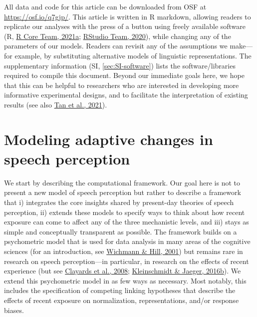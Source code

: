 \documentclass[
  11pt,
  man,floatsintext]{apa6}
\begin{document}
All data and code for this article can be downloaded from OSF at \url{https://osf.io/q7gjp/}. This article is written in R markdown, allowing readers to replicate our analyses with the press of a button using freely available software (R, \protect\hyperlink{ref-R}{R Core Team, 2021a}; \protect\hyperlink{ref-RStudio}{RStudio Team, 2020}), while changing any of the parameters of our models. Readers can revisit any of the assumptions we make---for example, by substituting alternative models of linguistic representations. The supplementary information (SI, \ref{sec:SI-software}) lists the software/libraries required to compile this document. Beyond our immediate goals here, we hope that this can be helpful to researchers who are interested in developing more informative experimental designs, and to facilitate the interpretation of existing results (see also \protect\hyperlink{ref-tan2021}{Tan et al., 2021}).

\hypertarget{sec:framework}{%
\section{Modeling adaptive changes in speech perception}\label{sec:framework}}

We start by describing the computational framework. Our goal here is not to present a new model of speech perception but rather to describe a framework that i) integrates the core insights shared by present-day theories of speech perception, ii) extends these models to specify ways to think about how recent exposure can come to affect any of the three mechanistic levels, and iii) stays as simple and conceptually transparent as possible. The framework builds on a psychometric model that is used for data analysis in many areas of the cognitive sciences (for an introduction, see \protect\hyperlink{ref-wichmann-hill2001}{Wichmann \& Hill, 2001}) but remains rare in research on speech perception---in particular, in research on the effects of recent experience (but see \protect\hyperlink{ref-clayards2008}{Clayards et al., 2008}; \protect\hyperlink{ref-kleinschmidt-jaeger2016cogsci}{Kleinschmidt \& Jaeger, 2016b}). We extend this psychometric model in as few ways as necessary. Most notably, this includes the specification of competing linking hypotheses that describe the effects of recent exposure on normalization, representations, and/or response biases.
\end{document}
